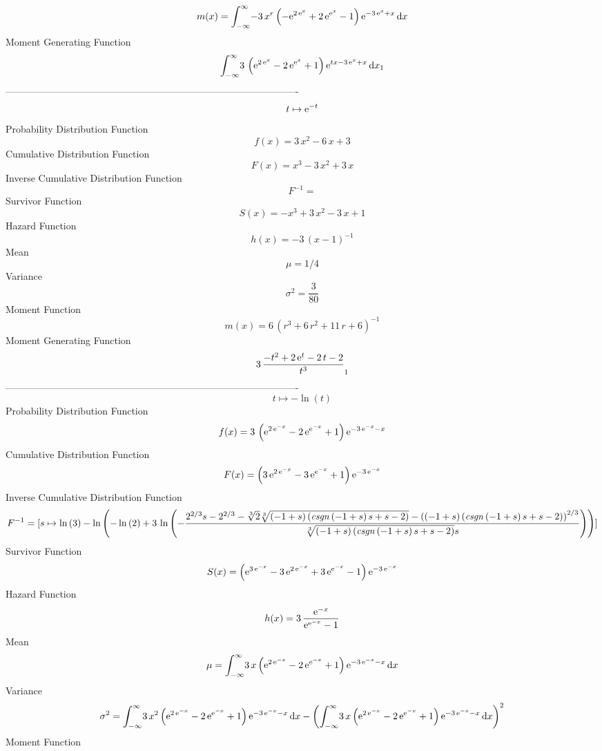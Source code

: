 \documentclass[12pt]{article}
\begin{document}
 $$ m(x) = \int_{-\infty }^{\infty }\!-3\,{x}^{r} \left( -{{\rm e}^{2\,{{\rm e}^{
x}}}}+2\,{{\rm e}^{{{\rm e}^{x}}}}-1 \right) {{\rm e}^{-3\,{{\rm e}^{x
}}+x}}\,{\rm d}x
$$ Moment Generating Function 
 $$\int_{-\infty }^{\infty }\!3\, \left( {{\rm e}^{2\,{{\rm e}^{x}}}}-2\,
{{\rm e}^{{{\rm e}^{x}}}}+1 \right) {{\rm e}^{tx-3\,{{\rm e}^{x}}+x}}
\,{\rm d}x_{{1}}
$$-------------------------------------------------------------------------------------------  \\$$t\mapsto {{\rm e}^{-t}}
$$Probability Distribution Function 
$$  f(x)=3\,{x}^{2}-6\,x+3
$$Cumulative Distribution Function  
 $$F(x)={x}^{3}-3\,{x}^{2}+3\,x
$$ Inverse Cumulative Distribution Function 
  $$F^{-1} = 
$$Survivor Function 
 $$ S(x)=-{x}^{3}+3\,{x}^{2}-3\,x+1
$$ Hazard Function 
 $$ h(x)=-3\, \left( x-1 \right) ^{-1}
$$Mean 
 $$ \mu=1/4
$$ Variance 
 $$ \sigma^2 = {\frac{3}{80}}
$$Moment Function 
 $$ m(x) = 6\, \left( {r}^{3}+6\,{r}^{2}+11\,r+6 \right) ^{-1}
$$ Moment Generating Function 
 $$3\,{\frac {-{t}^{2}+2\,{{\rm e}^{t}}-2\,t-2}{{t}^{3}}}_{{1}}
$$-------------------------------------------------------------------------------------------  \\$$t\mapsto -\ln  \left( t \right) 
$$Probability Distribution Function 
$$  f(x)=3\, \left( {{\rm e}^{2\,{{\rm e}^{-x}}}}-2\,{{\rm e}^{{{\rm e}^{-x}}}}
+1 \right) {{\rm e}^{-3\,{{\rm e}^{-x}}-x}}
$$Cumulative Distribution Function  
 $$F(x)= \left( 3\,{{\rm e}^{2\,{{\rm e}^{-x}}}}-3\,{{\rm e}^{{{\rm e}^{-x}}}}
+1 \right) {{\rm e}^{-3\,{{\rm e}^{-x}}}}
$$ Inverse Cumulative Distribution Function 
  $$F^{-1} = [s\mapsto \ln  \left( 3 \right) -\ln  \left( -\ln  \left( 2 \right) +3
\,\ln  \left( -{\frac {{2}^{2/3}s-{2}^{2/3}-\sqrt [3]{2}\sqrt [3]{
 \left( -1+s \right)  \left( {\it csgn} \left( -1+s \right) s+s-2
 \right) }- \left(  \left( -1+s \right)  \left( {\it csgn} \left( -1+s
 \right) s+s-2 \right)  \right) ^{2/3}}{\sqrt [3]{ \left( -1+s
 \right)  \left( {\it csgn} \left( -1+s \right) s+s-2 \right) }s}}
 \right)  \right) ]
$$Survivor Function 
 $$ S(x)= \left( {{\rm e}^{3\,{{\rm e}^{-x}}}}-3\,{{\rm e}^{2\,{{\rm e}^{-x}}}}
+3\,{{\rm e}^{{{\rm e}^{-x}}}}-1 \right) {{\rm e}^{-3\,{{\rm e}^{-x}}}
}
$$ Hazard Function 
 $$ h(x)=3\,{\frac {{{\rm e}^{-x}}}{{{\rm e}^{{{\rm e}^{-x}}}}-1}}
$$Mean 
 $$ \mu=\int_{-\infty }^{\infty }\!3\,x \left( {{\rm e}^{2\,{{\rm e}^{-x}}}}-2
\,{{\rm e}^{{{\rm e}^{-x}}}}+1 \right) {{\rm e}^{-3\,{{\rm e}^{-x}}-x}
}\,{\rm d}x
$$ Variance 
 $$ \sigma^2 = \int_{-\infty }^{\infty }\!3\,{x}^{2} \left( {{\rm e}^{2\,{{\rm e}^{-x
}}}}-2\,{{\rm e}^{{{\rm e}^{-x}}}}+1 \right) {{\rm e}^{-3\,{{\rm e}^{-
x}}-x}}\,{\rm d}x- \left( \int_{-\infty }^{\infty }\!3\,x \left( {
{\rm e}^{2\,{{\rm e}^{-x}}}}-2\,{{\rm e}^{{{\rm e}^{-x}}}}+1 \right) {
{\rm e}^{-3\,{{\rm e}^{-x}}-x}}\,{\rm d}x \right) ^{2}
$$Moment Function 
\end{document}
